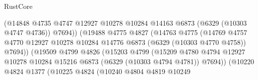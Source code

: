 \begin{lexlean}{RustCore}
\begin{coremodule}
                                          (@14848
                                            @4735
                                            @4747
                                            @12927
                                            @10278
                                            @10284
                                            @14163
                                            @6873
                                            (@6329 (@10303 @4747 @4736))
                                            @7694))
                                        (@19488
                                          @4775
                                          @4827
                                          (@14763
                                            @4775
                                            (@14769
                                              @4757
                                              @4770
                                              @12927
                                              @10278
                                              @10284
                                              @14776
                                              @6873
                                              (@6329 (@10303 @4770 @4758))
                                              @7694))
                                          (@19509
                                            @4799
                                            @4826
                                            (@15203
                                              @4799
                                              (@15209
                                                @4780
                                                @4794
                                                @12927
                                                @10278
                                                @10284
                                                @15216
                                                @6873
                                                (@6329 (@10303 @4794 @4781))
                                                @7694))
                                            (@10220
                                              @4824
                                              @1377
                                              (@10225
                                                @4824
                                                (@10240
                                                  @4804
                                                  @4819
                                                  @10249

\end{coremodule}
\end{lexlean}
